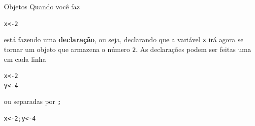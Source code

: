 \documentclass[10pt,handout]{beamer}\usepackage[]{graphicx}\usepackage[]{color}
\makeatletter
\newcommand{\hlnum}[1]{\textcolor[rgb]{0.686,0.059,0.569}{#1}}%
\newcommand{\hlstd}[1]{\textcolor[rgb]{0.345,0.345,0.345}{#1}}%
\newcommand{\hlkwb}[1]{\textcolor[rgb]{0.69,0.353,0.396}{#1}}%
\newenvironment{kframe}{%
 \def\at@end@of@kframe{}%
 \ifinner\ifhmode%
  \def\at@end@of@kframe{\end{minipage}}%
  \begin{minipage}{\columnwidth}%
 \fi\fi%
 \def\FrameCommand##1{\hskip\@totalleftmargin \hskip-\fboxsep
 \colorbox{shadecolor}{##1}\hskip-\fboxsep
     \hskip-\linewidth \hskip-\@totalleftmargin \hskip\columnwidth}%
 \MakeFramed {\advance\hsize-\width
   \@totalleftmargin\z@ \linewidth\hsize
   \@setminipage}}%
 {\par\unskip\endMakeFramed%
 \at@end@of@kframe}
\newenvironment{knitrout}{}{} %
\makeatother
\begin{document}
\begin{frame}[fragile]{Objetos}
Quando você faz
\begin{knitrout}\small
{}\color{fgcolor}\begin{kframe}
\begin{alltt}
\hlstd{x} \hlkwb{<-} \hlnum{2}
\end{alltt}
\end{kframe}
\end{knitrout}

está fazendo uma \textbf{declaração}, ou seja, declarando que a variável
\verb|x| irá agora se tornar um objeto que armazena o número
\verb|2|. As declarações podem ser feitas uma em cada linha
\begin{knitrout}\small
{}\color{fgcolor}\begin{kframe}
\begin{alltt}
\hlstd{x} \hlkwb{<-} \hlnum{2}
\hlstd{y} \hlkwb{<-} \hlnum{4}
\end{alltt}
\end{kframe}
\end{knitrout}

ou separadas por \verb|;|
\begin{knitrout}\small
{}\color{fgcolor}\begin{kframe}
\begin{alltt}
\hlstd{x} \hlkwb{<-} \hlnum{2}\hlstd{; y} \hlkwb{<-} \hlnum{4}
\end{alltt}
\end{kframe}
\end{knitrout}

\end{frame}
\end{document}

